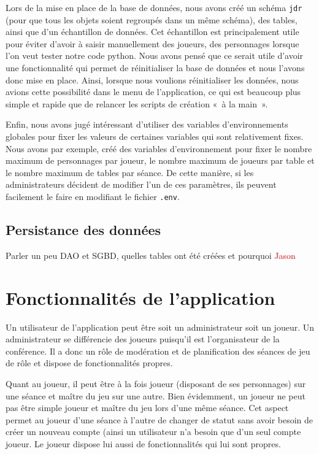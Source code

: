 \documentclass[11pt]{article}
\begin{document}
\bigbreak

Lors de la mise en place de la base de données, nous avons créé un schéma \texttt{jdr} (pour que tous les objets soient regroupés dans un même schéma), des tables, ainsi que d'un échantillon de données. Cet échantillon est principalement utile pour éviter d'avoir à saisir manuellement des joueurs, des personnages lorsque l'on veut tester notre code python. Nous avons pensé que ce serait utile d'avoir une fonctionnalité qui permet de réinitialiser la base de données et nous l'avons donc mise en place. 
Ainsi, lorsque nous voulions réinitialiser les données, nous avions cette possibilité dans le menu de l'application, ce qui est beaucoup plus simple et rapide que de relancer les scripts de création «~à la main~».

\bigbreak

Enfin, nous avons jugé intéressant d'utiliser des variables d'environnements globales pour fixer les valeurs de certaines variables qui sont relativement fixes. Nous avons par exemple, créé des variables d'environnement pour fixer le nombre maximum de personnages par joueur, le nombre maximum de joueurs par table et le nombre maximum de tables par séance. De cette manière, si les administrateurs décident de modifier l'un de ces paramètres, ils peuvent facilement le faire en modifiant le fichier \texttt{.env}.


\subsection{Persistance des données}

Parler un peu DAO et SGBD, quelles tables ont été créées et pourquoi
\textcolor{red}{Jason}


\newpage
\section{Fonctionnalités de l'application}

Un utilisateur de l'application peut être soit un administrateur soit un joueur. Un administrateur se différencie des joueurs puisqu'il est l'organisateur de la conférence. Il a donc un rôle de modération et de planification des séances de jeu de rôle et dispose de fonctionnalités propres.

Quant au joueur, il peut être à la fois joueur (disposant de ses personnages) sur une séance et maître du jeu sur une autre. Bien évidemment, un joueur ne peut pas être simple joueur et maître du jeu lors d’une même séance. Cet aspect permet au joueur d’une séance à l’autre de changer de statut sans avoir besoin de créer un nouveau compte (ainsi un utilisateur n’a besoin que d’un seul compte joueur. Le joueur dispose lui aussi de fonctionnalités qui lui sont propres.
\end{document}
